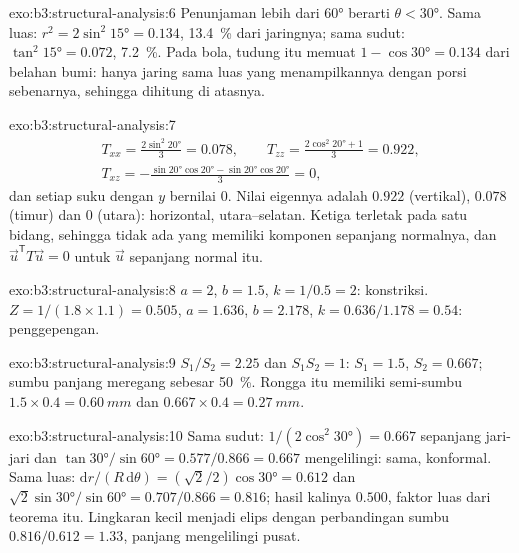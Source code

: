 \begin{solution}{exo:b3:structural-analysis:6}
Penunjaman lebih dari \ang{60} berarti $\theta < \ang{30}$. Sama luas: $r^2 =
2\sin^2\ang{15} = 0.134$, \qty{13.4}{\percent} dari jaringnya; sama sudut:
$\tan^2\ang{15} = 0.072$, \qty{7.2}{\percent}. Pada bola, tudung itu memuat
$1 - \cos\ang{30} = 0.134$ dari belahan bumi: hanya jaring sama luas yang menampilkannya
dengan porsi sebenarnya, sehingga  dihitung di atasnya.
\end{solution}

\begin{solution}{exo:b3:structural-analysis:7}
\begin{gather*}
  T_{xx} = \frac{2\sin^2\ang{20}}3 = 0.078,\qquad
  T_{zz} = \frac{2\cos^2\ang{20} + 1}3 = 0.922,\\
  T_{xz} = -\frac{\sin\ang{20}\cos\ang{20} - \sin\ang{20}\cos\ang{20}}3 = 0,
\end{gather*}
dan setiap suku dengan $y$ bernilai 0. Nilai eigennya adalah $0.922$ (vertikal),
$0.078$ (timur) dan $0$ (utara):  horizontal, utara--selatan.
Ketiga  terletak pada satu bidang, sehingga tidak ada yang memiliki komponen sepanjang normalnya,
dan $\vec u^{\mathsf T}T\vec u = 0$ untuk $\vec u$ sepanjang normal itu.
\end{solution}

\begin{solution}{exo:b3:structural-analysis:8}
$a = 2$, $b = 1.5$, $k = 1/0.5 = 2$: konstriksi. $Z = 1/(1.8\times1.1) =
0.505$, $a = 1.636$, $b = 2.178$, $k = 0.636/1.178 = 0.54$: penggepengan.
\end{solution}

\begin{solution}{exo:b3:structural-analysis:9}
$S_1/S_2 = 2.25$ dan $S_1S_2 = 1$: $S_1 = 1.5$, $S_2 = 0.667$; sumbu panjang
meregang sebesar \qty{50}{\percent}. Rongga itu memiliki semi-sumbu $1.5\times0.4 =
\qty{0.60}{mm}$ dan $0.667\times0.4 = \qty{0.27}{mm}$.
\end{solution}

\begin{solution}{exo:b3:structural-analysis:10}
Sama sudut: $1/(2\cos^2\ang{30}) = 0.667$ sepanjang jari-jari dan
$\tan\ang{30}/\sin\ang{60} = 0.577/0.866 = 0.667$ mengelilingi: sama, konformal.
Sama luas: $\mathrm dr/(R\,\mathrm d\theta) = (\sqrt2/2)\cos\ang{30} = 0.612$
dan $\sqrt2\sin\ang{30}/\sin\ang{60} = 0.707/0.866 = 0.816$; hasil kalinya
$0.500$, faktor luas dari teorema itu. Lingkaran kecil menjadi elips dengan
perbandingan sumbu $0.816/0.612 = 1.33$, panjang mengelilingi pusat.
\end{solution}

